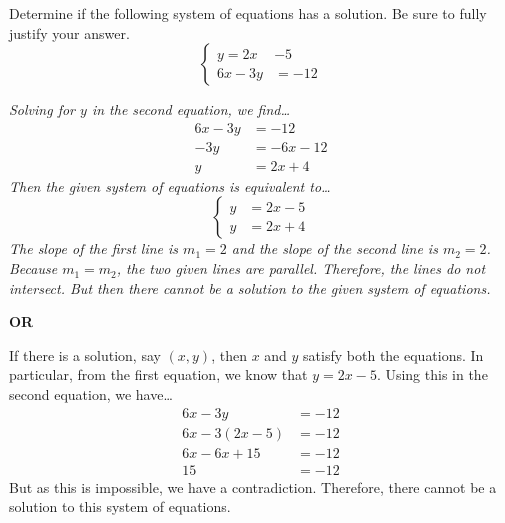 \documentclass[12pt,letterpaper]{exam}
\begin{document}
\examtitle
{} 
\scores
\bottomline
\newpage

\begin{questions}

\newpage
\question[6] Determine if the following system of equations has a solution. Be sure to fully justify your answer.
	\[
	\left\{
	\begin{aligned}
	y= 2x &- 5 \\
	6x - 3y&= -12
	\end{aligned}\right.
	\] \pspace

{\itshape Solving for $y$ in the second equation, we find\dots
	\[
	\begin{aligned}
	6x - 3y&= -12 \\[0.3cm]
	-3y&= -6x - 12 \\[0.3cm]
	y&= 2x + 4 	
	\end{aligned}
	\]
Then the given system of equations is equivalent to\dots
	\[
	\left\{
	\begin{aligned}
	y&= 2x - 5 \\
	y&= 2x + 4
	\end{aligned}\right.
	\]
The slope of the first line is $m_1= 2$ and the slope of the second line is $m_2= 2$. Because $m_1= m_2$, the two given lines are parallel. Therefore, the lines do not intersect. But then there cannot be a solution to the given system of equations. 

\begin{center} {\bfseries OR} \end{center}

If there is a solution, say $(x, y)$, then $x$ and $y$ satisfy both the equations. In particular, from the first equation, we know that $y= 2x - 5$. Using this in the second equation, we have\dots
	\[
	\begin{aligned}
	6x - 3y&= -12 \\[0.3cm]
	6x - 3(2x - 5)&= -12 \\[0.3cm]
	6x - 6x + 15&= -12 \\[0.3cm]
	15&= -12
	\end{aligned}
	\]
But as this is impossible, we have a contradiction. Therefore, there cannot be a solution to this system of equations. 
}




\end{questions}
\end{document}
